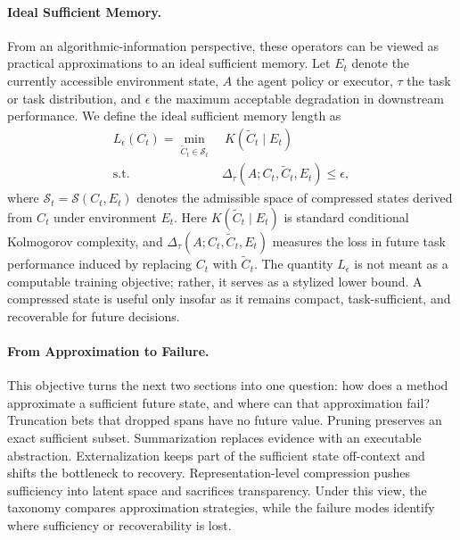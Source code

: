 \paragraph{Ideal Sufficient Memory.} From an algorithmic-information perspective, these operators can be viewed as practical approximations to an ideal sufficient memory. Let \(E_t\) denote the currently accessible environment state, \(A\) the agent policy or executor, \(\tau\) the task or task distribution, and \(\epsilon\) the maximum acceptable degradation in downstream performance. We define the ideal sufficient memory length as
\vspace{-.2cm}
\begin{equation}
\label{eq:ideal_sufficient_memory}
\begin{aligned}
L_{\epsilon}(C_t)
=
\min_{\tilde C_t \in \mathcal{S}_t}
&\ K(\tilde C_t \mid E_t) \\
\mathrm{s.t.}\quad
&\Delta_{\tau}(A; C_t,\tilde C_t,E_t) \leq \epsilon ,
\end{aligned}
\end{equation}
\vspace{-.1cm}
where \(\mathcal{S}_t = \mathcal{S}(C_t,E_t)\) denotes the admissible space of compressed states derived from \(C_t\) under environment \(E_t\). Here \(K(\tilde C_t \mid E_t)\) is standard conditional Kolmogorov complexity, and \(\Delta_{\tau}(A; C_t,\tilde C_t,E_t)\) measures the loss in future task performance induced by replacing \(C_t\) with \(\tilde C_t\). The quantity \(L_{\epsilon}\) is not meant as a computable training objective; rather, it serves as a stylized lower bound. A compressed state is useful only insofar as it remains compact, task-sufficient, and recoverable for future decisions.

\paragraph{From Approximation to Failure.} This objective turns the next two sections into one question: how does a method approximate a sufficient future state, and where can that approximation fail? Truncation bets that dropped spans have no future value. Pruning preserves an exact sufficient subset. Summarization replaces evidence with an executable abstraction. Externalization keeps part of the sufficient state off-context and shifts the bottleneck to recovery. Representation-level compression pushes sufficiency into latent space and sacrifices transparency. Under this view, the taxonomy compares approximation strategies, while the failure modes identify where sufficiency or recoverability is lost.

